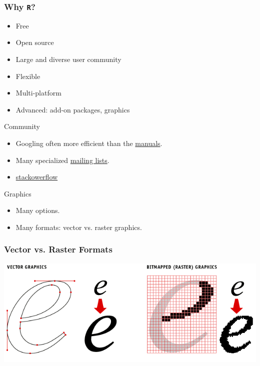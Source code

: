 \documentclass[20pt]{beamer}
\begin{document}
\begin{frame}
	\frametitle{Why \texttt{R}?}
	\begin{itemize}
		\item 	Free
		\item	Open source
		\item 	Large and diverse user community
		\item	Flexible
		\item 	Multi-platform
		\item 	Advanced: add-on packages, graphics
	\end{itemize}
\end{frame}


\begin{frame}{Community}
	\begin{itemize}
		\item Googling often more efficient than the \href{http://cran.r-project.org/manuals.html}{manuals}.
		\item Many specialized \href{http://www.r-project.org/mail.html}{mailing lists}.
		\item \href{http://stackoverflow.com/questions/tagged/r}{stackowerflow}
	\end{itemize}
\end{frame}


\begin{frame}{Graphics}
	\begin{itemize}
		\item 	Many options.
		\item	Many formats: vector vs. raster graphics.
	\end{itemize}
\end{frame}


\begin{frame}
	\frametitle{Vector vs. Raster Formats}
	\vspace*{-2mm}
%	
\href{http://kelseypromo.com/users/C7964980-844D-4673-BB99-4275098050BA/library/images/2259.gif}{\includegraphics[width=1.0\textwidth]{2259.png}}
%
\end{frame}
\end{document}
